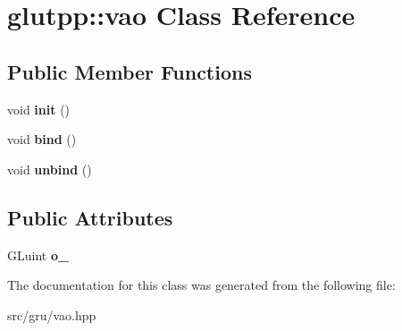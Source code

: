 \hypertarget{classglutpp_1_1vao}{\section{glutpp\-:\-:vao \-Class \-Reference}
\label{classglutpp_1_1vao}
}
\subsection*{\-Public \-Member \-Functions}
\begin{DoxyCompactItemize}
\item 
\hypertarget{classglutpp_1_1vao_a8ef0f944ab05f251bb7c2b9c938a32b6}{void {\bfseries init} ()}\label{classglutpp_1_1vao_a8ef0f944ab05f251bb7c2b9c938a32b6}

\item 
\hypertarget{classglutpp_1_1vao_ad162a38b7f0e9749bd6a6c917db70c0c}{void {\bfseries bind} ()}\label{classglutpp_1_1vao_ad162a38b7f0e9749bd6a6c917db70c0c}

\item 
\hypertarget{classglutpp_1_1vao_a2982afed99f8a8bc13ccd27b73f6121d}{void {\bfseries unbind} ()}\label{classglutpp_1_1vao_a2982afed99f8a8bc13ccd27b73f6121d}

\end{DoxyCompactItemize}
\subsection*{\-Public \-Attributes}
\begin{DoxyCompactItemize}
\item 
\hypertarget{classglutpp_1_1vao_a8b6c13fec6c3ecae720c6a3e54560a8d}{\-G\-Luint {\bfseries o\-\_\-}}\label{classglutpp_1_1vao_a8b6c13fec6c3ecae720c6a3e54560a8d}

\end{DoxyCompactItemize}


\-The documentation for this class was generated from the following file\-:\begin{DoxyCompactItemize}
\item 
src/gru/vao.\-hpp\end{DoxyCompactItemize}

